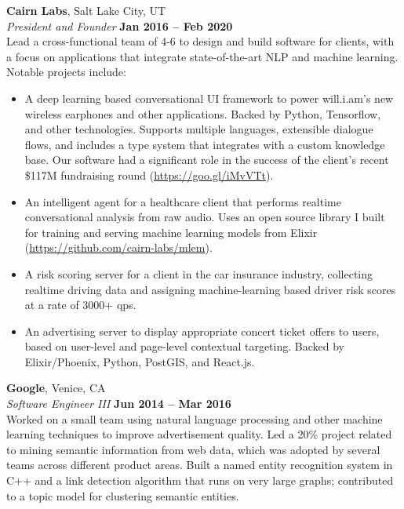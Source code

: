 \documentclass[margin,line]{resume}
\begin{document}
\begin{resume}
    \textbf{Cairn Labs}, Salt Lake City, UT \vspace{2mm}\\\vspace{1mm}%
    \textsl{President and Founder} \hfill \textbf{Jan 2016 -- Feb 2020}\\
    Lead a cross-functional team of 4-6 to design and build software
    for clients, with a focus on applications that integrate
    state-of-the-art NLP and machine learning. Notable projects include:

    \begin{itemize}
    \item A deep learning based conversational UI framework to power
      will.i.am's new wireless earphones and other applications. Backed by
      Python, Tensorflow, and other technologies. Supports multiple languages,
      extensible dialogue flows, and includes a type system that integrates with
      a custom knowledge base. Our software had a significant role in the
      success of the client's recent \$117M fundraising round
      (\url{https://goo.gl/iMvVTt}).
    \item An intelligent agent for a healthcare client that performs realtime
      conversational analysis from raw audio. Uses an open source library I
      built for training and serving machine learning models from Elixir
      (\url{https://github.com/cairn-labs/mlem}).
    \item A risk scoring server for a client in the car insurance industry,
      collecting realtime driving data and assigning machine-learning based
      driver risk scores at a rate of 3000+ qps.
    \item An advertising server to display appropriate concert ticket offers
      to users, based on user-level and page-level contextual targeting. Backed
      by Elixir/Phoenix, Python, PostGIS, and React.js.
    \end{itemize}

    \textbf{Google}, Venice, CA \vspace{2mm}\\\vspace{1mm}%
    \textsl{Software Engineer III} \hfill \textbf{Jun 2014 -- Mar 2016}\\
    Worked on a small team using natural language processing and other machine
    learning techniques to improve advertisement quality. Led a 20\% project
    related to mining semantic information from web data, which was adopted by
    several teams across different product areas. Built a named entity
    recognition system in C++ and a link detection algorithm that runs on very
    large graphs; contributed to a topic model for clustering semantic entities.


\end{resume}
\end{document}
